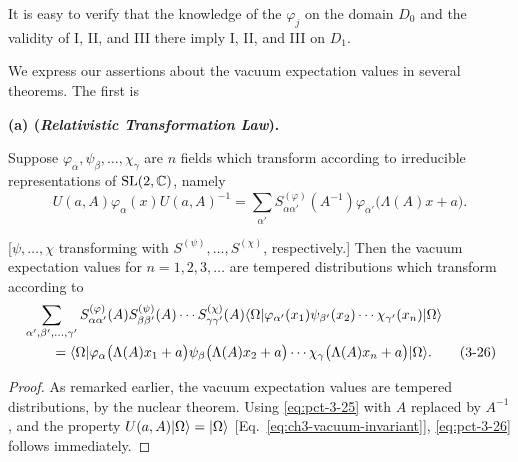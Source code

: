 It is easy to verify that the knowledge of the $\varphi_j$ on the domain
$D_0$ and the validity of I, II, and III there imply I, II, and III on $D_1$.

We express our assertions about the vacuum expectation values in several
theorems. The first is

\begin{theorem}\label{thm:ch3-1-vacuum-transformation-laws}
\textbf{(a) (\emph{Relativistic Transformation Law}).}\par
Suppose $\varphi_\alpha,\psi_\beta,\ldots,\chi_\gamma$ are $n$ fields
which transform according to irreducible representations of
$\mathrm{SL}(2,\mathbb{C})$, namely
\begin{equation}
 U(a,A)\varphi_\alpha(x)U(a,A)^{-1}
 =\sum_{\alpha'}S^{(\varphi)}_{\alpha\alpha'}(A^{-1})
 \varphi_{\alpha'}\bigl(\Lambda(A)x+a\bigr).
 \tag{3-25}\label{eq:pct-3-25}
\end{equation}

[$\psi,\ldots,\chi$ transforming with
$S^{(\psi)},\ldots,S^{(\chi)}$, respectively.] Then the vacuum
expectation values for $n=1,2,3,\ldots$ are tempered distributions which
transform according to
\begin{align}
 &\sum_{\alpha',\beta',\ldots,\gamma'}
 S^{(\varphi)}_{\alpha\alpha'}(A)S^{(\psi)}_{\beta\beta'}(A)\cdots
 S^{(\chi)}_{\gamma\gamma'}(A)
 \langle \Omega\rvert\varphi_{\alpha'}(x_1)\psi_{\beta'}(x_2)\cdots
 \chi_{\gamma'}(x_n)\lvert \Omega\rangle
 \notag\\
 &\qquad=\langle \Omega\rvert\varphi_\alpha\bigl(\Lambda(A)x_1+a\bigr)
 \psi_\beta\bigl(\Lambda(A)x_2+a\bigr)\cdots
 \chi_\gamma\bigl(\Lambda(A)x_n+a\bigr)\lvert \Omega\rangle.
 \tag{3-26}\label{eq:pct-3-26}
\end{align}
\end{theorem}

\begin{proof}
As remarked earlier, the vacuum expectation values are tempered
distributions, by the nuclear theorem. Using \eqref{eq:pct-3-25} with $A$ replaced by
$A^{-1}$, and the property $U(a,A)\lvert \Omega\rangle=\lvert \Omega\rangle$ [Eq.~\eqref{eq:ch3-vacuum-invariant}],
\eqref{eq:pct-3-26} follows immediately.
\end{proof}

